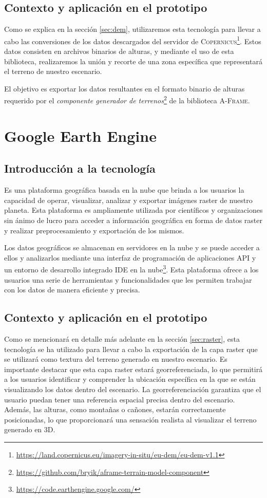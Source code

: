 \documentclass[a4paper, 11pt]{book}
\begin{document}
\subsection{Contexto y aplicación en el prototipo}
Como se explica en la sección \ref{sec:dem}, utilizaremos esta tecnología para llevar a cabo las conversiones de los datos descargados del servidor de \textsc{Copernicus}\footnote{\url{https://land.copernicus.eu/imagery-in-situ/eu-dem/eu-dem-v1.1}}. Estos datos consisten en archivos binarios de alturas, y mediante el uso de esta biblioteca, realizaremos la unión y recorte de una zona específica que representará el terreno de nuestro escenario.

El objetivo es exportar los datos resultantes en el formato binario de alturas requerido por el \emph{componente generador de terrenos}\footnote{\url{https://github.com/bryik/aframe-terrain-model-component}} de la biblioteca \textsc{A-Frame}.
\section{Google Earth Engine}
\subsection{Introducción a la tecnología}
Es una plataforma geográfica basada en la nube que brinda a los usuarios la capacidad de operar, visualizar, analizar y exportar imágenes \gls{raster} de nuestro planeta. Esta plataforma es ampliamente utilizada por científicos y organizaciones sin ánimo de lucro para acceder a información geográfica en forma de datos raster y realizar preprocesamiento y exportación de los mismos.

Los datos geográficos se almacenan en servidores en la nube y se puede acceder a ellos y analizarlos mediante una interfaz de programación de aplicaciones \textsc{API} y un entorno de desarrollo integrado \textsc{IDE} en la nube\footnote{\url{https://code.earthengine.google.com/}}. 
Esta plataforma ofrece a los usuarios una serie de herramientas y funcionalidades que les permiten trabajar con los datos de manera eficiente y precisa.
\subsection{Contexto y aplicación en el prototipo}
Como se mencionará en detalle más adelante en la sección \ref{sec:raster}, esta tecnología se ha utilizado para llevar a cabo la exportación de la capa raster que se utilizará como textura del terreno generado en nuestro escenario. Es importante destacar que esta capa raster estará georreferenciada, lo que permitirá a los usuarios identificar y comprender la ubicación específica en la que se están visualizando los datos dentro del escenario.
La georreferenciación garantiza que el usuario puedan tener una referencia espacial precisa dentro del escenario. Además, las alturas, como montañas o cañones, estarán correctamente posicionadas, lo que proporcionará una sensación realista al visualizar el terreno generado en \textsc{3D}.
\end{document}
